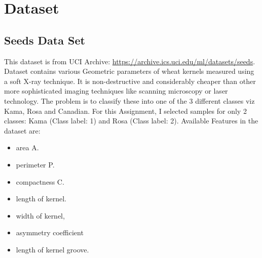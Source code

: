 \documentclass[11pt, pdftex]{article}
\title{Assignment (MiniProject) #3}
\author{Machiry Aravind Kumar}
\date{UCSB}
\begin{document}
\maketitle
\section{Dataset}
\subsection{Seeds Data Set}
This dataset is from UCI Archive: \url{https://archive.ics.uci.edu/ml/datasets/seeds}. Dataset contains various Geometric parameters of wheat kernels measured using a soft X-ray technique. It is non-destructive and considerably cheaper than other more sophisticated imaging techniques like scanning microscopy or laser technology. The problem is to classify these into one of the 3 different classes viz  Kama, Rosa and Canadian. For this Assignment, I selected samples for only 2 classes: Kama (Class label: 1) and Rosa (Class label: 2). Available Features in the dataset are:
\begin{itemize}
\item area A.
\item perimeter P.
\item compactness C.
\item length of kernel.
\item width of kernel,
\item asymmetry coefficient
\item length of kernel groove.
\end{itemize}
\end{document}
